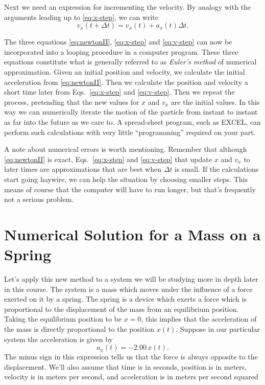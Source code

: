 Next we need an expression for incrementing the velocity.  By analogy
with the arguments leading up to \eqref{eq:x-step}, we can write
\begin{equation}
  v_x(t+\Delta t) = v_x(t) + a_x(t)\Delta t.
  \label{eq:v-step}
\end{equation}

The three equations \eqref{eq:newtonII}, \eqref{eq:x-step} and
\eqref{eq:v-step} can now be incorporated into a looping procedure in
a computer program.  These three equations constitute what is
generally referred to as \emph{Euler's method} of numerical
approximation.  Given an initial position and velocity, we calculate
the initial acceleration from \eqref{eq:newtonII}.  Then we
calculate the position and velocity a short time later from
Eqs.~\eqref{eq:x-step} and \eqref{eq:v-step}.  Then we repeat the
process, pretending that the new values for $x$ and $v_x$ are the
initial values.  In this way we can numerically iterate the motion of
the particle from instant to instant as far into the future as we care
to.  A spread-sheet program, such as EXCEL, can perform such
calculations with very little ``programming'' required on your part.

A note about numerical errors is worth mentioning.  Remember that
although \eqref{eq:newtonII} is exact, Eqs.~\eqref{eq:x-step} and
\eqref{eq:v-step} that update $x$ and $v_x$ to later times are
approximations that are best when $\Delta t$ is small.  If the
calculations start going haywire, we can help the situation by
choosing smaller steps.  This means of course that the computer will
have to run longer, but that's frequently not a serious problem.

\section{Numerical Solution for a Mass on a Spring}

Let's apply this new method to a system we will be studying more in
depth later in this course.  The system is a mass which moves under
the influence of a force exerted on it by a spring.  The spring is a
device which exerts a force which is proportional to the displacement
of the mass from an equilibrium position.  Taking the equilibrium
position to be $x = 0$, this implies that the acceleration of the mass
is directly proportional to the position $x(t)$.  Suppose in our
particular system the acceleration is given by 
\begin{equation}
a_x(t) = -2.00\, x(t).
\end{equation}
The minus sign in this expression tells us that the force is
always opposite to the displacement.  We'll also assume that time is
in seconds, position is in meters, velocity is in meters per second,
and acceleration is in meters per second squared
   
